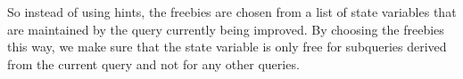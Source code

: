So instead of using hints, the freebies are chosen from a list of state
variables that are maintained by the query currently being improved. By choosing
the freebies this way, we make sure that the state variable is only free for
subqueries derived from the current query and not for any other queries.
